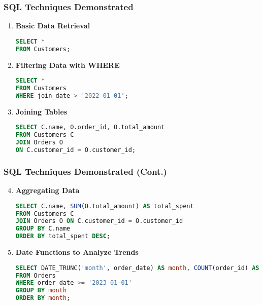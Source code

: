 \documentclass[aspectratio=169]{beamer}
\begin{document}
\begin{frame}[fragile]
    \frametitle{SQL Techniques Demonstrated}
    \begin{enumerate}
        \item \textbf{Basic Data Retrieval}
        \begin{lstlisting}[language=SQL]
SELECT * 
FROM Customers;
        \end{lstlisting}
        
        \item \textbf{Filtering Data with WHERE}
        \begin{lstlisting}[language=SQL]
SELECT * 
FROM Customers 
WHERE join_date > '2022-01-01';
        \end{lstlisting}

        \item \textbf{Joining Tables}
        \begin{lstlisting}[language=SQL]
SELECT C.name, O.order_id, O.total_amount 
FROM Customers C
JOIN Orders O 
ON C.customer_id = O.customer_id;
        \end{lstlisting}
    \end{enumerate}
\end{frame}

\begin{frame}[fragile]
    \frametitle{SQL Techniques Demonstrated (Cont.)}
    \begin{enumerate}
        \setcounter{enumi}{3}
        \item \textbf{Aggregating Data}
        \begin{lstlisting}[language=SQL]
SELECT C.name, SUM(O.total_amount) AS total_spent
FROM Customers C
JOIN Orders O ON C.customer_id = O.customer_id
GROUP BY C.name 
ORDER BY total_spent DESC;
        \end{lstlisting}

        \item \textbf{Date Functions to Analyze Trends}
        \begin{lstlisting}[language=SQL]
SELECT DATE_TRUNC('month', order_date) AS month, COUNT(order_id) AS order_count
FROM Orders
WHERE order_date >= '2023-01-01'
GROUP BY month
ORDER BY month;
        \end{lstlisting}
    \end{enumerate}
\end{frame}
\end{document}
